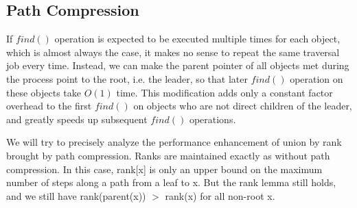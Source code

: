 \subsection{Path Compression}
If $find()$ operation is expected to be executed multiple times for each object, which is almost always the case, it makes no sense to repeat the same traversal job every time. Instead, we can make the parent pointer of all objects met during the process point to the root, i.e. the leader, so that later $find()$ operation on these objects take $O(1)$ time. This modification adds only a constant factor overhead to the first $find()$ on objects who are not direct children of the leader, and greatly speeds up subsequent $find()$ operations.
\begin{algorithmic}[1]
\EndWhile
{}
\EndWhile
{}
\EndFunction
\end{algorithmic}
We will try to precisely analyze the performance enhancement of union by rank brought by path compression. Ranks are maintained exactly as without path compression. In this case, rank[x] is only an upper bound on the maximum number of steps along a path from a leaf to x. But the rank lemma still holds, and we still have rank(parent(x)) $>$ rank(x) for all non-root x.
